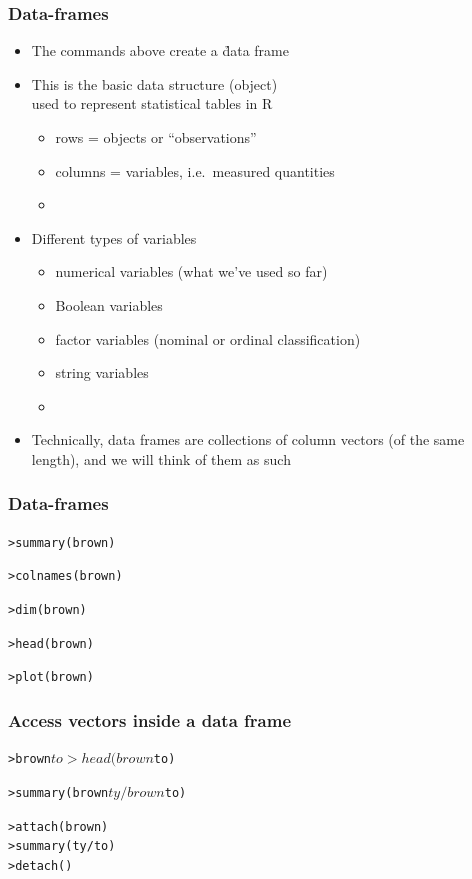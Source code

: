 \documentclass[t]{beamer} %
\begin{document}
\begin{frame}
  \frametitle{Data-frames}

  \begin{itemize}
  \item The commands above create a \h{data frame}
  \item This is the basic data structure (object)\\
    used to represent statistical tables in R
    \begin{itemize}
    \item rows = objects or ``observations''
    \item columns = variables, i.e.\ measured quantities
    \item[]
    \end{itemize}
  \item Different types of variables
    \begin{itemize}
    \item numerical variables (what we've used so far)
    \item Boolean variables
    \item factor variables (nominal or ordinal classification)
    \item string variables
    \item[]
    \end{itemize}
  \item Technically, data frames are collections of column vectors (of the same
    length), and we will think of them as such
  \end{itemize}

\end{frame}


\begin{frame}[fragile]
  \frametitle{Data-frames}

\begin{alltt}
> summary(brown)

> colnames(brown)

> dim(brown)       

> head(brown)

> plot(brown)
\end{alltt}

\end{frame}


\begin{frame}[fragile]
  \frametitle{Access vectors inside a data frame}

\begin{alltt}
> brown$to

> head(brown$to)


> summary(brown$ty / brown$to)

> attach(brown)   
> summary(ty/to)
> detach()  
\end{alltt}

\end{frame}
\end{document}
